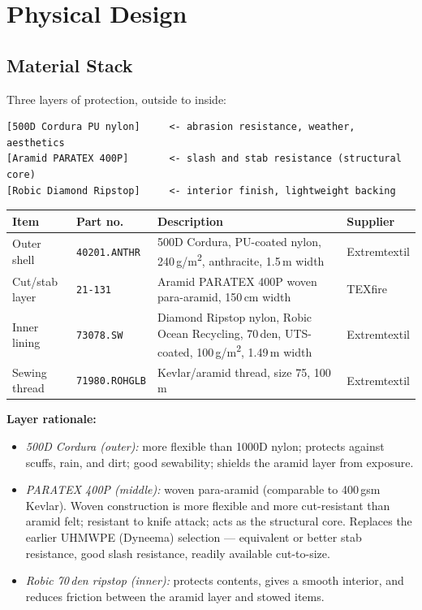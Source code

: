 \documentclass[11pt,a4paper]{article}
\newcommand{\partno}[1]{\texttt{#1}}
\begin{document}
\section{Physical Design}

\subsection{Material Stack}

Three layers of protection, outside to inside:

\begin{Verbatim}[frame=single,fontsize=\small]
[500D Cordura PU nylon]     <- abrasion resistance, weather, aesthetics
[Aramid PARATEX 400P]       <- slash and stab resistance (structural core)
[Robic Diamond Ripstop]     <- interior finish, lightweight backing
\end{Verbatim}

\begin{table}[h]
\small
\begin{tabularx}{\textwidth}{llLl}
\toprule
\textbf{Item} & \textbf{Part no.} & \textbf{Description} & \textbf{Supplier}\\
\midrule
Outer shell & \partno{40201.ANTHR} & 500D Cordura, PU-coated nylon, 240\,g/m\textsuperscript{2}, anthracite, 1.5\,m width & Extremtextil\\
Cut/stab layer & \partno{21-131} & Aramid PARATEX 400P woven para-aramid, 150\,cm width & TEXfire\\
Inner lining & \partno{73078.SW} & Diamond Ripstop nylon, Robic Ocean Recycling, 70\,den, UTS-coated, 100\,g/m\textsuperscript{2}, 1.49\,m width & Extremtextil\\
Sewing thread & \partno{71980.ROHGLB} & Kevlar/aramid thread, size 75, 100\,m & Extremtextil\\
\bottomrule
\end{tabularx}
\end{table}

\textbf{Layer rationale:}

\begin{itemize}
  \item \emph{500D Cordura (outer):} more flexible than 1000D nylon; protects against scuffs, rain, and dirt; good sewability; shields the aramid layer from exposure.
  \item \emph{PARATEX 400P (middle):} woven para-aramid (comparable to 400\,gsm Kevlar). Woven construction is more flexible and more cut-resistant than aramid felt; resistant to knife attack; acts as the structural core. Replaces the earlier UHMWPE (Dyneema) selection --- equivalent or better stab resistance, good slash resistance, readily available cut-to-size.
  \item \emph{Robic 70\,den ripstop (inner):} protects contents, gives a smooth interior, and reduces friction between the aramid layer and stowed items.
\end{itemize}
\end{document}
